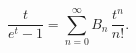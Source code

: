 \begin{equation}
\frac{t}{e^t-1}=\sum_{n=0}^\infty B_n\, \frac{t^n}{n!}.
\label{ber}
\end{equation}

